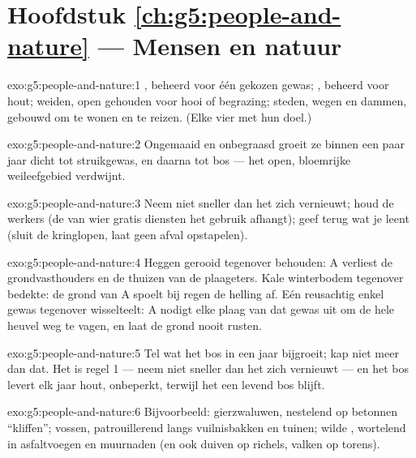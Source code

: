 \section*{Hoofdstuk \ref{ch:g5:people-and-nature} --- Mensen en natuur}

\begin{solution}{exo:g5:people-and-nature:1}
, beheerd voor één gekozen gewas; , beheerd voor hout;
weiden, open gehouden voor hooi of begrazing; steden, wegen en dammen,
gebouwd om te wonen en te reizen. (Elke vier met hun doel.)
\end{solution}

\begin{solution}{exo:g5:people-and-nature:2}
Ongemaaid en onbegraasd groeit ze binnen een paar jaar dicht tot
struikgewas, en daarna tot bos --- het open, bloemrijke weileefgebied
verdwijnt.
\end{solution}

\begin{solution}{exo:g5:people-and-nature:3}
Neem niet sneller dan het zich vernieuwt; houd de werkers (de 
van wier gratis diensten het gebruik afhangt); geef terug wat je leent
(sluit de kringlopen, laat geen afval opstapelen).
\end{solution}

\begin{solution}{exo:g5:people-and-nature:4}
Heggen gerooid tegenover behouden: A verliest de grondvasthouders en de
thuizen van de plaageters. Kale winterbodem tegenover bedekte: de grond
van A spoelt bij regen de helling af. Eén reusachtig enkel gewas
tegenover wisselteelt: A nodigt elke plaag van dat gewas uit om de hele
heuvel weg te vagen, en laat de grond nooit rusten.
\end{solution}

\begin{solution}{exo:g5:people-and-nature:5}
Tel wat het bos in een jaar bijgroeit; kap niet meer dan dat. Het is
regel 1 --- neem niet sneller dan het zich vernieuwt --- en het bos
levert elk jaar hout, onbeperkt, terwijl het een levend bos blijft.
\end{solution}

\begin{solution}{exo:g5:people-and-nature:6}
Bijvoorbeeld: gierzwaluwen, nestelend op betonnen ``kliffen''; vossen,
patrouillerend langs vuilnisbakken en tuinen; wilde , wortelend
in asfaltvoegen en muurnaden (en ook duiven op richels, valken op torens).
\end{solution}

